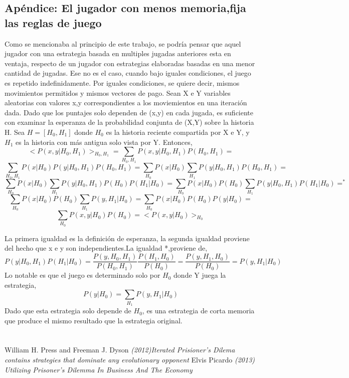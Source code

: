 \documentclass[12pt]{article}
\begin{document}
\subsection{Apéndice: El jugador con menos memoria,fija las reglas de juego}
Como se mencionaba al principio de este trabajo, se podría pensar que aquel jugador
con una estrategia basada en multiples jugadas anteriores esta en ventaja, respecto de 
un jugador con estrategias elaboradas basadas en una menor cantidad de jugadas.
Ese no es el caso, cuando bajo iguales condiciones, el juego es repetido  indefinidamente.
Por iguales condiciones, se quiere decir, mismos movimientos permitidos y mismos vectores
de pago.\newline
Sean X e Y variables aleatorias con valores x,y correspondientes a los moviemientos en una iteración dada.
Dado que los puntajes solo dependen de (x,y) en cada jugada, es suficiente con examinar la esperanza
de la probabilidad conjunta de  (X,Y) sobre la historia H.
Sea $H=[H_0,H_1]$ donde $H_0$ es la historia reciente compartida por X e Y, y $H_1$ es la historia con más antigua
solo vista por Y. Entonces,
$$<P(x,y|H_0,H_1)>_{H_0,H_1}=\sum_{H_0,H_1}P(x,y|H_0,H_1) P(H_0,H_1)=$$
$$\sum_{H_0,H_1} P(x|H_0)P(y|H_0,H_1)P(H_0,H_1)=\sum_{H_0} P(x|H_0) \sum_{H_1} P(y|H_0,H_1)P(H_0,H_1)=$$
$$\sum_{H_0}P(x|H_0)\sum_{H_1}P(y|H_0,H_1)P(H_0)P(H_1|H_0) =\sum_{H_0}P(x|H_0)P(H_0) \sum_{H_1}P(y|H_0,H_1)P(H_1|H_0)=^*$$
$$\sum_{H_0}P(x|H_0)P(H_0)\sum_{H_1} P(y,H_1|H_0)=\sum_{H_0}P(x|H_0)P(H_0)P(y|H_0)=$$
$$\sum_{H_0}P(x,y|H_0)P(H_0)=<P(x,y|H_0)>_{H_0} $$

La primera igualdad es la definición de esperanza, la segunda igualdad proviene del hecho que x e y son independientes.La 
igualdad *,proviene de,
$$P(y|H_0,H_1)P(H_1|H_0)=\frac{P(y,H_0,H_1)}{P(H_0,H_1)} \frac{P(H_1,H_0)}{P(H_0)}=\frac{P(y,H_1,H_0)}{P(H_0)}=P(y,H_1|H_0)$$
Lo notable es que el juego es determinado solo por $H_0$ donde Y juega la estrategia,
$$P(y|H_0)=\sum_{H_1}P(y,H_1|H_0)$$
Dado que esta estrategia solo depende de $H_0$, es una estrategia de corta memoria que produce el mismo
resultado que la estrategia original.


\newpage
 \section{}
  \begin{thebibliography}{1}
  \bibitem{}  William H. Press and Freeman J. Dyson {\em (2012)Iterated Prisioner's Dilema contains strategies that dominate any evolutionary opponent}
  \bibitem{}  Elvis Picardo {\em (2013) Utilizing Prisoner’s Dilemma In Business And The Economy }
  \end{thebibliography}
\end{document}

